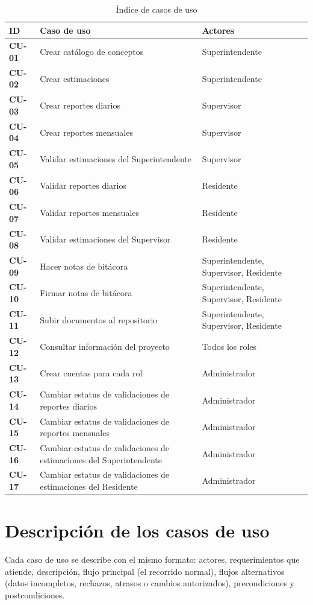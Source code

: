 \begin{table}[h]
\centering\small
\caption{Índice de casos de uso}\label{tab:indice-cu}
\renewcommand{\arraystretch}{1.12}
\begin{tabularx}{\linewidth}{@{}>{\sffamily\bfseries\color{guinda}}lX>{\raggedright\arraybackslash}p{5.4cm}@{}}
\toprule
\normalfont\sffamily\bfseries ID & \sffamily\bfseries Caso de uso & \sffamily\bfseries Actores\\\midrule
CU-01 & Crear catálogo de conceptos & Superintendente\\
CU-02 & Crear estimaciones & Superintendente\\
CU-03 & Crear reportes diarios & Supervisor\\
CU-04 & Crear reportes mensuales & Supervisor\\
CU-05 & Validar estimaciones del Superintendente & Supervisor\\
CU-06 & Validar reportes diarios & Residente\\
CU-07 & Validar reportes mensuales & Residente\\
CU-08 & Validar estimaciones del Supervisor & Residente\\
CU-09 & Hacer notas de bitácora & Superintendente, Supervisor, Residente\\
CU-10 & Firmar notas de bitácora & Superintendente, Supervisor, Residente\\
CU-11 & Subir documentos al repositorio & Superintendente, Supervisor, Residente\\
CU-12 & Consultar información del proyecto & Todos los roles\\
CU-13 & Crear cuentas para cada rol & Administrador\\
CU-14 & Cambiar estatus de validaciones de reportes diarios & Administrador\\
CU-15 & Cambiar estatus de validaciones de reportes mensuales & Administrador\\
CU-16 & Cambiar estatus de validaciones de estimaciones del Superintendente & Administrador\\
CU-17 & Cambiar estatus de validaciones de estimaciones del Residente & Administrador\\
\bottomrule
\end{tabularx}
\end{table}

\section{Descripción de los casos de uso}
Cada caso de uso se describe con el mismo formato: actores, requerimientos que atiende, descripción, flujo principal (el recorrido normal), flujos alternativos (datos incompletos, rechazos, atrasos o cambios autorizados), precondiciones y postcondiciones.

